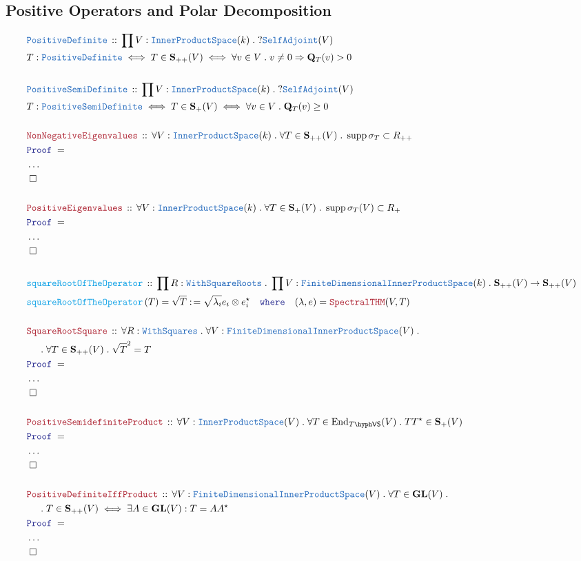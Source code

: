 \documentclass[12pt]{scrartcl}%
\newcommand{\TYPE}[1]{\textcolor{NavyBlue}{\mathtt{#1}}}%
\newcommand{\FUNC}[1]{\textcolor{Cerulean}{\mathtt{#1}}}%
\newcommand{\LOGIC}[1]{\textcolor{Blue}{\mathtt{#1}}}%
\newcommand{\THM}[1]{\textcolor{Maroon}{\mathtt{#1}}}%
\renewcommand{\.}{\; . \;} %
\newcommand{\de}{: \kern 0.1pc =} %
\newcommand{\where}{\LOGIC{where}} %
\newcommand{\Act}[1]{\left( #1 \right)} %
\newcommand{\Theorem}[2]{& \THM{#1} \, :: \, #2 \\ & \Proof = \\ } %
\newcommand{\DeclareType}[2]{& \TYPE{#1} \, :: \, #2 \\}%
\newcommand{\DefineNamedType}[4]{& #1 : \TYPE{#2} \iff #3 \iff #4 \\}%
\newcommand{\DeclareFunc}[2]{& \FUNC{#1} \, :: \, #2 \\}%
\newcommand{\DefineNamedFunc}[4]{&  \FUNC{#1}\Act{#2} = #3 \de #4 \\}%
\newcommand{\NewLine}{\\ & \kern 1pc}%
\newcommand{\Page}[1]{ \begin{align*} #1 \end{align*}  }%
\newcommand{\NoProof}{ & \ldots \\ \EndProof}%
\DeclareMathOperator*{\supp}{supp}%
\newcommand{\End}{\mathrm{End}}%
\newcommand{\QED}{\; \square} %
\newcommand{\EndProof}{& \QED \\} %
\newcommand{\Proof}{\LOGIC{Proof} \; } %
\newcommand{\GL}{\mathbf{GL}}%
\newcommand{\IPS}{\TYPE{InnerProductSpace}}
\newcommand{\FDIPS}{\TYPE{FiniteDimensionalInnerProductSpace}}
\newcommand{\SA}{\TYPE{SelfAdjoint}}
\newcommand{\VS}[1]{#1\hyph\mathsf{VS}} %
\renewcommand{\S}{\mathbf{S}}
\begin{document}
\subsection{Positive Operators and Polar Decomposition}
\Page{
	\DeclareType{PositiveDefinite}{  \prod V : \IPS(k) \.  ?\SA(V) }
	\DefineNamedType{T}{PositiveDefinite}{T \in \S_{++}(V)}{ \forall v \in V \. v \neq 0 \Rightarrow \mathbf{Q}_T(v) > 0 }
	\\
	\DeclareType{PositiveSemiDefinite}{  \prod V : \IPS(k) \.  ?\SA(V) }
	\DefineNamedType{T}{PositiveSemiDefinite}{T \in \S_{+}(V)}{ \forall v \in V \.  \mathbf{Q}_T(v) \ge 0 }
	\\
	\Theorem{NonNegativeEigenvalues}{ \forall V : \IPS(k) \. \forall T \in \S_{++}(V) \. \supp \sigma_T \subset R_{++}  }
	\NoProof
	\\
	\Theorem{PositiveEigenvalues}{\forall V : \IPS(k) \. \forall T \in \S_{+}(V) \. \supp \sigma_T(V) \subset R_{+} }
	\NoProof
	\\
	\DeclareFunc{squareRootOfTheOperator}{ \prod R : \TYPE{WithSquareRoots} \. \prod V : \FDIPS(k) \.  \S_{++}(V) \to \S_{++}(V)}
	\DefineNamedFunc{squareRootOfTheOperator}{T}{\sqrt{T}}{ \sqrt{\lambda_i}e_i \otimes e_i^\star \quad \where \quad (\lambda, e) = \THM{SpectralTHM}( V,T)  }	
	\\
	\Theorem{SquareRootSquare}{\forall R : \TYPE{WithSquares} \. \forall V : \FDIPS(V) \. \NewLine  \.  \forall T \in \S_{++}(V) \. \sqrt{T}^2 = T }
        \NoProof
	\\
	\Theorem{PositiveSemidefiniteProduct}{\forall V : \IPS(V) \. \forall T \in \End_{\VS{T}}(V) \. TT^\star \in \S_+(V)}
	\NoProof
	\\
	\Theorem{PositiveDefiniteIffProduct}{\forall V : \FDIPS(V) \. \forall  T \in \GL(V) \.  \NewLine \. T \in \S_{++}(V) \iff \exists A \in \GL(V) : T = AA^\star}
	\NoProof
}
\end{document}
